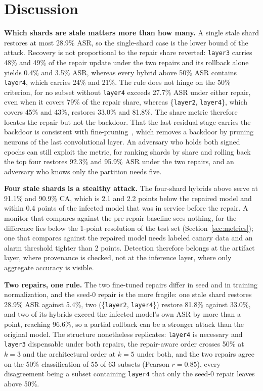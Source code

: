 \documentclass[conference,a4paper]{IEEEtran}  %
\begin{document}
\section{Discussion}
\label{sec:discussion}

\textbf{Which shards are stale matters more than how many.} A single stale
shard restores at most 28.9\% ASR, so the single-shard case is the lower bound
of the attack. Recovery is not proportional to the repair share reverted:
\texttt{layer3} carries 48\% and 49\% of the repair update under the two
repairs and its rollback alone yields 0.4\% and 3.5\% ASR, whereas every hybrid
above 50\% ASR contains \texttt{layer4}, which carries 24\% and 21\%. The rule
does not hinge on the 50\% criterion, for no subset without \texttt{layer4}
exceeds 27.7\% ASR under either repair, even when it covers 79\% of the repair
share, whereas \{\texttt{layer2}, \texttt{layer4}\}, which covers 45\% and
43\%, restores 33.0\% and 81.8\%. The share metric therefore locates the repair
but not the backdoor. That the last residual stage carries the backdoor is
consistent with fine-pruning~\cite{liu2018fineprune}, which removes a backdoor
by pruning neurons of the last convolutional layer. An adversary who
holds both signed epochs can still exploit the metric, for ranking shards by
share and rolling back the top four restores 92.3\% and 95.9\% ASR under the
two repairs, and an adversary who knows only the partition needs five.

\textbf{Four stale shards is a stealthy attack.} The four-shard hybrids above
serve at 91.1\% and 90.9\% CA, which is 2.1 and 2.2 points below the repaired
model and within 0.4 points of the infected model that was in service before
the repair. A monitor that compares against the pre-repair baseline sees
nothing, for the difference lies below the 1-point resolution of the test set
(Section~\ref{sec:metrics}); one that compares against the repaired model
needs labeled canary data and an alarm threshold tighter than 2 points. Detection
therefore belongs at the artifact layer, where provenance is checked, not at
the inference layer, where only aggregate accuracy is visible.

\textbf{Two repairs, one rule.} The two fine-tuned repairs differ in seed and
in training normalization, and the seed-0 repair is the more fragile: one stale
shard restores 28.9\% ASR against 5.4\%, two (\{\texttt{layer2},
\texttt{layer4}\}) restore 81.8\% against 33.0\%, and two of its hybrids
exceed the infected model's own ASR by more than a point, reaching 96.6\%, so a partial rollback can
be a stronger attack than the original model. The structure nonetheless
replicates: \texttt{layer4} is necessary and \texttt{layer3} dispensable under
both repairs, the repair-aware order crosses 50\% at $k=3$ and the
architectural order at $k=5$ under both, and the two repairs agree on the 50\%
classification of 55 of 63 subsets (Pearson $r = 0.85$), every disagreement
being a subset containing \texttt{layer4} that only the seed-0 repair leaves
above 50\%.
\end{document}
